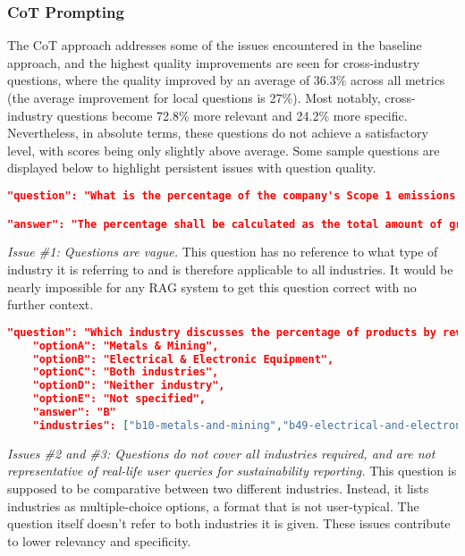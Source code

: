 \subsubsection{CoT Prompting}

The CoT approach addresses some of the issues encountered in the baseline approach, and the highest quality improvements are seen for cross-industry questions, where the quality improved by an average of 36.3\% across all metrics (the average improvement for local questions is 27\%). Most notably, cross-industry questions become 72.8\% more relevant and 24.2\% more specific. Nevertheless, in absolute terms, these questions do not achieve a satisfactory level, with scores being only slightly above average. Some sample questions are displayed below to highlight persistent issues with question quality.

\begin{lstlisting}[language=JSON,firstnumber=1,label={lst:cot_example1},caption={Question Example 1: Local single-hop free-text}]
"question": "What is the percentage of the company's Scope 1 emissions that are covered under emissions-limiting regulations?",

"answer": "The percentage shall be calculated as the total amount of gross global Scope 1 GHG emissions (CO2-e) that are covered under emissions-limiting regulations divided by the total amount of gross global Scope 1 GHG emissions (CO2-e).",
\end{lstlisting}

\textit{Issue \#1: Questions are vague.} This question has no reference to what type of industry it is referring to and is therefore applicable to all industries. It would be nearly impossible for any RAG system to get this question correct with no further context.


\begin{lstlisting}[language=JSON,firstnumber=1,label={lst:cot_example2},caption={Question Example 2: Cross-industry single-hop MCQ}]
"question": "Which industry discusses the percentage of products by revenue that contain IEC 62474 declarable substances?",
    "optionA": "Metals & Mining",
    "optionB": "Electrical & Electronic Equipment",
    "optionC": "Both industries",
    "optionD": "Neither industry",
    "optionE": "Not specified",
    "answer": "B"
    "industries": ["b10-metals-and-mining","b49-electrical-and-electronic-equipment"]
\end{lstlisting}

\textit{Issues \#2 and \#3: Questions do not cover all industries required, and are not representative of real-life user queries  for sustainability reporting.} This question is supposed to be comparative between two different industries. Instead, it lists industries as multiple-choice options, a format that is not user-typical. The question itself doesn't refer to both industries it is given. These issues contribute to lower relevancy and specificity. 




